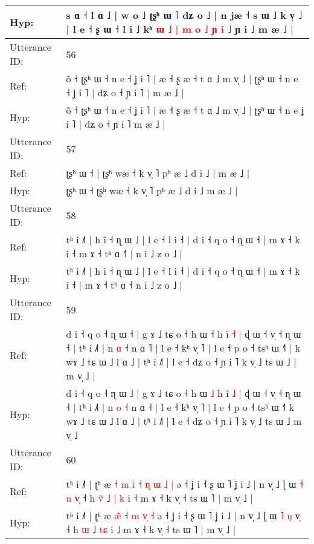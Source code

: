 \documentclass[10pt]{article}
\DeclareRobustCommand{\hl}[1]{{\textcolor{red}{#1}}}
\begin{document}
\begin{longtable}{ll}
Hyp: & s ɑ ˧ l ɑ ˩ | w o ˩ ʈʂʰ ɯ ˥ dʑ o ˩ | n jæ ˧ s ɯ ˩ k v̩ ˩ | l e ˧ ʂ ɯ ˧\hl{}\hl{} l i ˩ kʰ \hl{ɯ} \hl{˩} \hl{|} \hl{m} \hl{o} \hl{˩} \hl{}\hl{ɲ} \hl{}\hl{i} \hl{˩} ɲ i ˩\hl{}\hl{} m æ ˩ |
 \\
\midrule
Utterance ID: & 56 \\
Ref: & õ ˧ ʈʂʰ ɯ ˧ n e ˧ ʝ i ˥ | æ ˧ ʂ æ ˧ t ɑ ˩ m v̩ ˩ | ʈʂʰ ɯ ˧ n e\hl{ }\hl{˧} ʝ i ˥ | dʑ o ˧ ɲ i ˥\hl{ }\hl{|} m æ ˩ |
 \\
Hyp: & õ ˧ ʈʂʰ ɯ ˧ n e ˧ ʝ i ˥ | æ ˧ ʂ æ ˧ t ɑ ˩ m v̩ ˩ | ʈʂʰ ɯ ˧ n e\hl{}\hl{} ʝ i ˥ | dʑ o ˧ ɲ i ˥\hl{}\hl{} m æ ˩ |
 \\
\midrule
Utterance ID: & 57 \\
Ref: & ʈʂʰ ɯ ˧\hl{ }\hl{|} ʈʂʰ wæ ˧ k v̩ ˥ pʰ æ ˩ d i ˩\hl{ }\hl{|} m æ ˩ |
 \\
Hyp: & ʈʂʰ ɯ ˧\hl{}\hl{} ʈʂʰ wæ ˧ k v̩ ˥ pʰ æ ˩ d i ˩\hl{}\hl{} m æ ˩ |
 \\
\midrule
Utterance ID: & 58 \\
Ref: & tʰ i ˩˥ | h ĩ ˧ ɳ ɯ ˩ | l e ˧ l i ˧ | d i ˧ q o ˧ ɳ ɯ ˧ | m ɤ ˧ k i ˧\hl{}\hl{} m ɤ ˧ tʰ ɑ ˧\hl{˥}\hl{ }\hl{|} n i ˩ z o ˩ |
 \\
Hyp: & tʰ i ˩˥ | h ĩ ˧ ɳ ɯ ˩ | l e ˧ l i ˧ | d i ˧ q o ˧ ɳ ɯ ˧ | m ɤ ˧ k i ˧\hl{ }\hl{|} m ɤ ˧ tʰ ɑ ˧\hl{}\hl{}\hl{} n i ˩ z o ˩ |
 \\
\midrule
Utterance ID: & 59 \\
Ref: & d i ˧ q o ˧ ɳ ɯ \hl{˧} | g ɤ ˩ tɕ o ˧ h ɯ \hl{˧} h ĩ \hl{˧} | ɖ ɯ ˧ v̩ ˧ ɳ ɯ ˧ | tʰ i ˩˥ | n \hl{ɑ} ˧ n ɑ \hl{˥} | l e ˧ kʰ v̩ ˥ | l e ˧ p o ˧ tsʰ ɯ ˧˥\hl{ }\hl{|} k wɤ ˩ tɕ ɯ ˩ l ɑ ˩ | tʰ i ˩˥ | l e ˧ dʑ o ˧ ɲ i ˥ k v̩ ˩ ts ɯ ˩\hl{ }\hl{|} m v̩ ˩\hl{ }\hl{|}
 \\
Hyp: & d i ˧ q o ˧ ɳ ɯ \hl{˩} | g ɤ ˩ tɕ o ˧ h ɯ \hl{˩} h ĩ \hl{˩} | ɖ ɯ ˧ v̩ ˧ ɳ ɯ ˧ | tʰ i ˩˥ | n \hl{o} ˧ n ɑ \hl{˧} | l e ˧ kʰ v̩ ˥ | l e ˧ p o ˧ tsʰ ɯ ˧˥\hl{}\hl{} k wɤ ˩ tɕ ɯ ˩ l ɑ ˩ | tʰ i ˩˥ | l e ˧ dʑ o ˧ ɲ i ˥ k v̩ ˩ ts ɯ ˩\hl{}\hl{} m v̩ ˩\hl{}\hl{}
 \\
\midrule
Utterance ID: & 60 \\
Ref: & tʰ i ˩˥ | ʈʰ æ\hl{ }\hl{˧} \hl{m}\hl{ }\hl{i} ˧ \hl{ɳ} \hl{ɯ}\hl{ }\hl{˩} \hl{|} ə ˧ ʝ i ˧ ʂ ɯ ˥ ʝ i ˩ | n v̩ ˩ ɭ ɯ \hl{˧} \hl{n} v̩ ˧ h \hl{v}\hl{̃} ˩ \hl{|}\hl{ }\hl{k} i \hl{˧} m ɤ ˧ k v̩ ˧ ts ɯ ˥ | m v̩ ˩ |
 \\
Hyp: & tʰ i ˩˥ | ʈʰ æ\hl{}\hl{} \hl{}\hl{æ}\hl{̃} ˧ \hl{m} \hl{}\hl{v}\hl{̩} \hl{˧} ə ˧ ʝ i ˧ ʂ ɯ ˥ ʝ i ˩ | n v̩ ˩ ɭ ɯ \hl{˥} \hl{ŋ} v̩ ˧ h \hl{}\hl{ɯ} ˩ \hl{}\hl{t}\hl{ɕ} i \hl{˩} m ɤ ˧ k v̩ ˧ ts ɯ ˥ | m v̩ ˩ |

\end{longtable}
\end{document}

